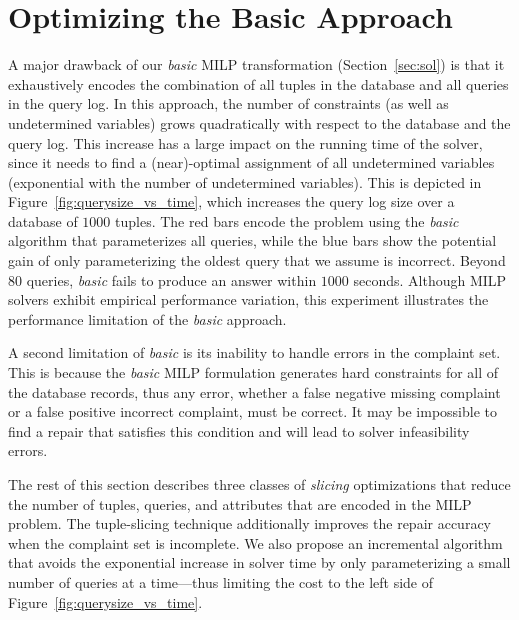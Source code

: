 

\section{Optimizing the Basic Approach}
\label{sec:opt}

A major drawback of our \emph{basic} MILP transformation (Section~\ref{sec:sol}) is
that it exhaustively encodes the combination of all tuples in the database and all queries
in the query log.  In this approach, the number of constraints (as well as undetermined variables) 
grows quadratically with respect to the database and the query log.
This increase has a large impact on the running time of the solver, since it needs to find a (near)-optimal 
assignment of all undetermined variables (exponential with the number of undetermined variables).
This is depicted in Figure~\ref{fig:querysize_vs_time}, which increases the query log size over a database of $1000$ tuples.  
The red bars encode the problem using  the \emph{basic} algorithm that parameterizes all queries, while the blue bars show the potential gain of only parameterizing the oldest query that we assume is incorrect.
Beyond $80$ queries, \emph{basic} fails to produce an answer within $1000$ seconds.
Although MILP solvers exhibit empirical performance variation,
this experiment illustrates the performance limitation of the \emph{basic} approach. 

A second limitation of \emph{basic} is its inability to handle errors in the complaint set.
This is because the \emph{basic} MILP formulation generates hard constraints for all of the database records, thus any error, whether a false negative missing complaint or a false positive incorrect complaint, must be correct.
It may be impossible to find a repair that satisfies this condition and will lead to solver infeasibility errors.


The rest of this section describes three classes of \emph{slicing} optimizations that 
reduce the number of tuples, queries, and attributes that are encoded in the MILP problem. 
The tuple-slicing technique additionally improves the repair accuracy when the complaint set is incomplete. 
We also propose an incremental algorithm that avoids the exponential increase in solver time by only parameterizing a small number of queries at a time---thus limiting
the cost to the left side of Figure~\ref{fig:querysize_vs_time}.







